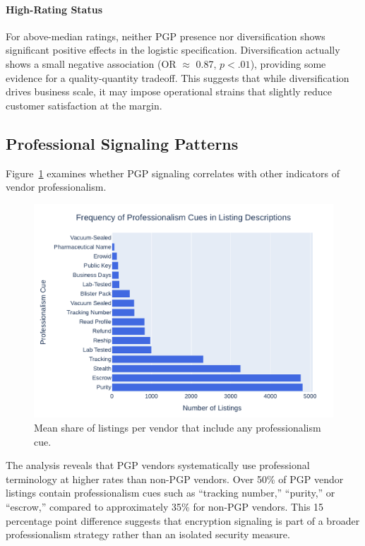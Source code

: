 \documentclass{article}
\begin{document}
\paragraph{High-Rating Status}
For above-median ratings, neither PGP presence nor diversification shows significant positive effects in the logistic specification. Diversification actually shows a small negative association (OR $\approx$ 0.87, $p < .01$), providing some evidence for a quality-quantity tradeoff. This suggests that while diversification drives business scale, it may impose operational strains that slightly reduce customer satisfaction at the margin.

\subsection{Professional Signaling Patterns}

Figure~\ref{fig:bar_prof_cues} examines whether PGP signaling correlates with other indicators of vendor professionalism.

\begin{figure}[htbp]
  \centering
  \includegraphics[width=.85\textwidth]{bar_professionalism_terms.pdf}
  \caption{Mean share of listings per vendor that include any professionalism cue.}
  \label{fig:bar_prof_cues}
\end{figure}

The analysis reveals that PGP vendors systematically use professional terminology at higher rates than non-PGP vendors. Over 50\% of PGP vendor listings contain professionalism cues such as ``tracking number,'' ``purity,'' or ``escrow,'' compared to approximately 35\% for non-PGP vendors. This 15 percentage point difference suggests that encryption signaling is part of a broader professionalism strategy rather than an isolated security measure.
\end{document}
